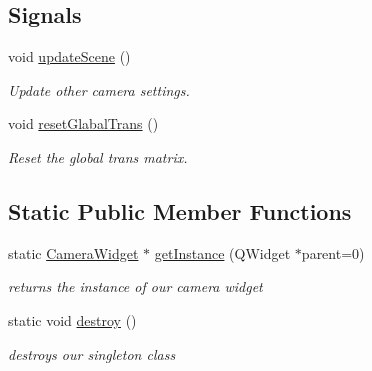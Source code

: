 \subsection*{Signals}
\begin{DoxyCompactItemize}
\item 
\hypertarget{class_camera_widget_a2d52203c831cd5bc904013def64f5e8e}{void \hyperlink{class_camera_widget_a2d52203c831cd5bc904013def64f5e8e}{update\-Scene} ()}\label{class_camera_widget_a2d52203c831cd5bc904013def64f5e8e}

\begin{DoxyCompactList}\small\item\em Update other camera settings. \end{DoxyCompactList}\item 
\hypertarget{class_camera_widget_a720c2c65e5c6189aa34f5d4485a1c9e6}{void \hyperlink{class_camera_widget_a720c2c65e5c6189aa34f5d4485a1c9e6}{reset\-Glabal\-Trans} ()}\label{class_camera_widget_a720c2c65e5c6189aa34f5d4485a1c9e6}

\begin{DoxyCompactList}\small\item\em Reset the global trans matrix. \end{DoxyCompactList}\end{DoxyCompactItemize}
\subsection*{Static Public Member Functions}
\begin{DoxyCompactItemize}
\item 
\hypertarget{class_camera_widget_a295cbb74d2843858399fdc45777b580d}{static \hyperlink{class_camera_widget}{Camera\-Widget} $\ast$ \hyperlink{class_camera_widget_a295cbb74d2843858399fdc45777b580d}{get\-Instance} (Q\-Widget $\ast$parent=0)}\label{class_camera_widget_a295cbb74d2843858399fdc45777b580d}

\begin{DoxyCompactList}\small\item\em returns the instance of our camera widget \end{DoxyCompactList}\item 
\hypertarget{class_camera_widget_ad50a84d433e82fdf8f1f5c7633abad17}{static void \hyperlink{class_camera_widget_ad50a84d433e82fdf8f1f5c7633abad17}{destroy} ()}\label{class_camera_widget_ad50a84d433e82fdf8f1f5c7633abad17}

\begin{DoxyCompactList}\small\item\em destroys our singleton class \end{DoxyCompactList}\end{DoxyCompactItemize}
